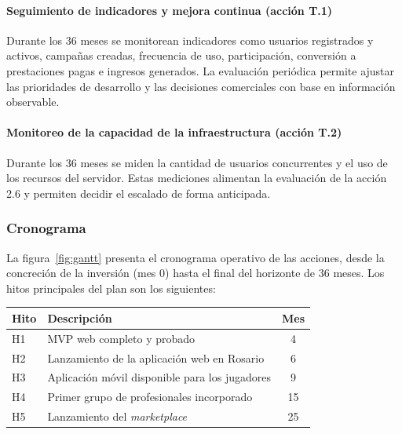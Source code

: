 \paragraph{Seguimiento de indicadores y mejora continua (acción T.1)}
Durante los 36 meses se monitorean indicadores como usuarios registrados y activos, campañas creadas, frecuencia de uso, participación, conversión a prestaciones pagas e ingresos generados. La evaluación periódica permite ajustar las prioridades de desarrollo y las decisiones comerciales con base en información observable.

\paragraph{Monitoreo de la capacidad de la infraestructura (acción T.2)}
Durante los 36 meses se miden la cantidad de usuarios concurrentes y el uso de los recursos del servidor. Estas mediciones alimentan la evaluación de la acción 2.6 y permiten decidir el escalado de forma anticipada.

\subsubsection{Cronograma}\label{sec:cronograma}
La figura~\ref{fig:gantt} presenta el cronograma operativo de las acciones, desde la concreción de la inversión (mes 0) hasta el final del horizonte de 36 meses. Los hitos principales del plan son los siguientes:

\begin{center}
\small
\begin{tabularx}{\textwidth}{|l|X|c|}
\hline
\textbf{Hito} & \textbf{Descripción} & \textbf{Mes}\\ \hline
H1 & MVP web completo y probado & 4\\ \hline
H2 & Lanzamiento de la aplicación web en Rosario & 6\\ \hline
H3 & Aplicación móvil disponible para los jugadores & 9\\ \hline
H4 & Primer grupo de profesionales incorporado & 15\\ \hline
H5 & Lanzamiento del \textit{marketplace} & 25\\ \hline
\end{tabularx}
\end{center}

